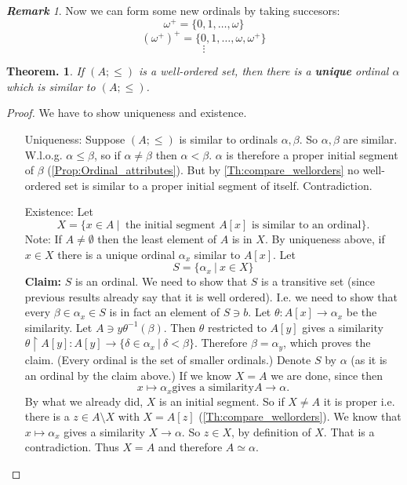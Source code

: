\documentclass[a4paper,oneside,11pt,DIV=12,parskip=half]{scrartcl}
\theoremstyle{plain}
\newtheorem{theorem}{Theorem.}[section]
\theoremstyle{definition}
\newtheorem{remark, definition}[theorem]{Remark and Definition.}
\newtheorem{lemma, definition}[theorem]{Lemma and Definition.}
\newtheorem{theorem, definition}[theorem]{Theorem and Definition.}
\theoremstyle{remark}
\newtheorem*{remark}{\textbf{Remark}}
\newtheorem*{remark, example}{\textbf{Remark and Exercise}}
\begin{document}
\begin{remark}

Now we can form some new ordinals by taking succesors:
\[ \omega ^+ = \{ 0,1, \dots, \omega \} \]
\[ (\omega^+)^+ = \{ 0,1,\dots,\omega,\omega^+ \} \]
\[ \vdots \]

\end{remark}

\begin{theorem}\label{Th:Every_set_sim_to_ordinal}
If $(A;\leq)$ is a well-ordered set, then there is a \textbf{unique} ordinal $\alpha$ which is similar to $(A;\leq)$.
\end{theorem}

\begin{proof} 
We have to show uniqueness and existence.
\begin{itemize}
    \item[Uniqueness:]  Suppose $(A;\leq)$ is similar to ordinals $\alpha,\beta$. So $\alpha,\beta$ are similar. W.l.o.g. $\alpha \leq \beta$, so if $\alpha \neq \beta$ then $\alpha < \beta$. $\alpha$ is therefore a proper initial segment of $\beta$ (\ref{Prop:Ordinal_attributes}). But by \ref{Th:compare_wellorders} no well-ordered set is similar to a proper initial segment of itself. Contradiction.
    \item[Existence:] Let
    \[ X = \{ x \in A ~|~ \text{ the initial segment $A[x]$ is similar to an ordinal} \}. \]
    Note: If $A \neq \emptyset$ then the least element of $A$ is in $X$. By uniqueness above, if $x \in X$ there is a unique ordinal $\alpha_x$ similar to $A[x]$. Let
        \[ S = \{ \alpha_x ~|~ x \in X \} \]
    \textbf{Claim: } $S$ is an ordinal.
    We need to show that $S$ is a transitive set (since previous results already say that it is well ordered).
    I.e. we need to show that every $\beta \in \alpha_x \in S$ is in fact an element of $S \ni b$.
    Let $\theta: A[x] \rightarrow \alpha_x$ be the similarity.
    Let $A \ni y \theta^{-1}(\beta)$. Then $\theta$ restricted to $A[y]$ gives a similarity
    $\theta \upharpoonright A[y]: A[y] \rightarrow \{ \delta \in \alpha_x ~|~ \delta < \beta \}$. Therefore $\beta = \alpha_y$, which proves the claim. (Every ordinal is the set of smaller ordinals.)
    Denote $S$ by $\alpha$ (as it is an ordinal by the claim above.) If we know $X = A$ we are done, since then
        \[ x \mapsto \alpha_x \text{gives a similarity} A \rightarrow \alpha . \]
    By what we already did, $X$ is an initial segment. So if $X \neq A$ it is proper i.e. there is a $z \in A \setminus X$ with $X = A[z]$ (\ref{Th:compare_wellorders}).
    We know that $x \mapsto \alpha_x$ gives a similarity $X \rightarrow \alpha$. So $z \in X$, by definition of $X$. That is a contradiction. Thus $ X= A$ and therefore $A \simeq \alpha$.
\end{itemize}
\end{proof}
\end{document}
